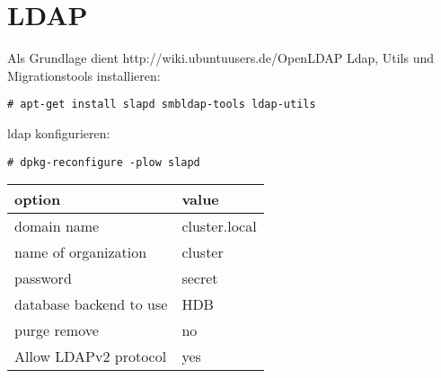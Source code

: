 \chapter{LDAP}
Als Grundlage dient http://wiki.ubuntuusers.de/OpenLDAP
Ldap, Utils und Migrationstools installieren:
\begin{lstlisting}[style=Bash]
# apt-get install slapd smbldap-tools ldap-utils
\end{lstlisting}
ldap konfigurieren:
\begin{lstlisting}[style=Bash]
# dpkg-reconfigure -plow slapd
\end{lstlisting}
\begin{tabular}{ l | l }
 option & value\\
 \hline
 domain name & cluster.local\\
 name of organization & cluster\\
 password & secret\\
 database backend to use & HDB\\
 purge remove & no\\
 Allow LDAPv2 protocol & yes\\
\end{tabular}
